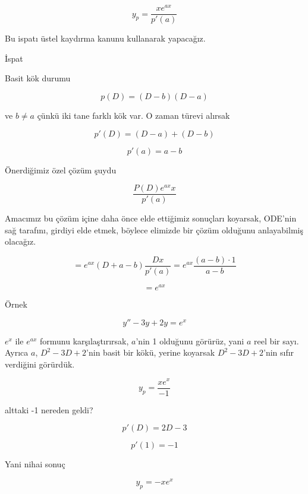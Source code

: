 \documentclass[12pt,fleqn]{article}\usepackage{../../common}
\begin{document}
$$ y_p = \frac{x e^{ax}}{p'(a)} $$

Bu ispatı üstel kaydırma kanunu kullanarak yapacağız. 

İspat

Basit kök durumu

$$ p(D) = (D-b)(D-a) $$

ve $b \ne a$ çünkü iki tane farklı kök var. O zaman türevi alırsak

$$ p'(D) = (D-a) + (D-b) $$

$$ p'(a) = a-b $$

Önerdiğimiz özel çözüm şuydu

$$ \frac{P(D) e^{ax} x}{p'(a)} $$

Amacımız bu çözüm içine daha önce elde ettiğimiz sonuçları koyarsak,
ODE'nin sağ tarafını, girdiyi elde etmek, böylece elimizde bir çözüm
olduğunu anlayabilmiş olacağız. 

$$ = e^{ax}(D+a-b)\frac{Dx}{p'(a)} = e^{ax} \frac{(a-b) \cdot 1}{a-b} $$

$$ = e^{ax} $$

Örnek

$$ y'' - 3y + 2y = e^x $$

$e^x$ ile $e^{ax}$ formunu karşılaştırırsak, $a$'nin 1 olduğunu görürüz,
yani $a$ reel bir sayı. Ayrıca $a$, $D^2-3D+2$'nin basit bir kökü, yerine
koyarsak $D^2-3D+2$'nin sıfır verdiğini görürdük. 

$$ y_p = \frac{xe^x}{-1} $$

alttaki -1 nereden geldi? 

$$ p'(D) = 2D - 3 $$

$$ p'(1) = -1 $$

Yani nihai sonuç

$$ y_p = -xe^x $$
\end{document}

